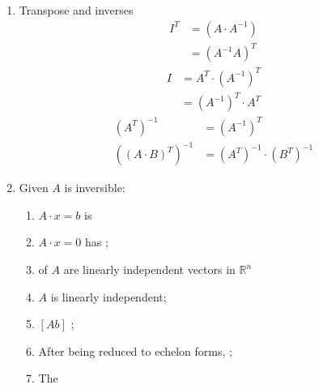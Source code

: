 \begin{enumerate}
    \item Transpose and inverses 
    \begin{align*}
      I^{T} &= \left( A \cdot A^{-1} \right) \\ 
      &= \left( A^{-1} A \right)^{T}
    \end{align*}
    \begin{align*}
      I &= A^{T} \cdot \left( A^{-1} \right)^{T} \\ 
      &= \left( A^{-1} \right)^{T} \cdot A^{T}
    \end{align*}
    \begin{align*}
      \left( A^{T} \right)^{-1} &= \left( A^{-1} \right)^{T} \\ 
      \left( \left( A \cdot B \right)^{T} \right)^{-1} &= 
      \left( A^{T} \right)^{-1} \cdot \left( B^{T} \right)^{-1}
    \end{align*}
    
    \item Given $ A $ is inversible:
    \begin{enumerate}
      \item $ A \cdot x = b $ is 
      
      \item $ A \cdot x = 0 $ has ;
      
      \item {} of $ A $ are 
      linearly independent vectors in $ \mathbb{R}^{n} $
      
      \item $ A $ is linearly independent;
      
      \item $ \left[ A b \right] $ ;
      
      \item After being reduced to echelon forms, 
      ;
      
      \item The 
    \end{enumerate}
  \end{enumerate}